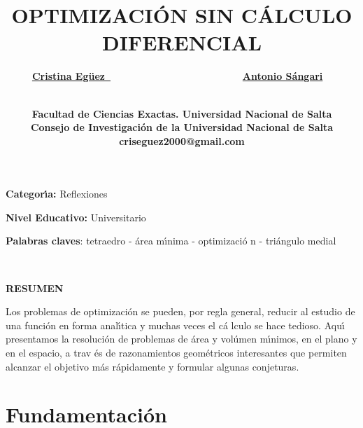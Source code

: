\documentclass[a4paper,spanish]{article}
\begin{document}
\title{\textbf{OPTIMIZACI\'{O}N SIN C\'{A}LCULO DIFERENCIAL}}
\author{\underline{\textbf{Cristina Eg\"{u}ez\ }}\textbf{\ \ \ \ \ \ \ \ \ \
\ \ \ \ \ \ \ \ \ \ \ \ } \ \underline{\textbf{Antonio S\'{a}ngari}}\textbf{%
\ } \and \ \ \ \ \ \ \  \\
\textbf{Facultad de Ciencias Exactas. Universidad Nacional de Salta}\\
\textbf{Consejo de Investigaci\'{o}n de la Universidad Nacional de Salta}\\
\textbf{criseguez2000@gmail.com}}
\date{}
\maketitle

\textbf{Categor\'{\i}a:} Reflexiones

\textbf{Nivel Educativo:} Universitario

\textbf{Palabras claves}: tetraedro - \'{a}rea m\'{\i}nima - optimizaci\'{o}%
n - tri\'{a}ngulo medial

\ \ \ \ \ \ \ \ \ \ \ \ \ \ \ \ \ \ \ \ \ \ \ \ \ \ \ \ \ \ \ \ 

\begin{center}
\textbf{RESUMEN}
\end{center}

Los problemas de optimizaci\'{o}n se pueden, por regla general, reducir al
estudio de una funci\'{o}n en forma anal\'{\i}tica y muchas veces el c\'{a}%
lculo se hace tedioso. Aqu\'{\i} presentamos la resoluci\'{o}n de problemas
de \'{a}rea y vol\'{u}men m\'{\i}nimos, en el plano y en el espacio, a trav%
\'{e}s de razonamientos geom\'{e}tricos interesantes que permiten alcanzar
el objetivo m\'{a}s r\'{a}pidamente y formular algunas conjeturas.

\section{Fundamentaci\'{o}n}
\end{document}
